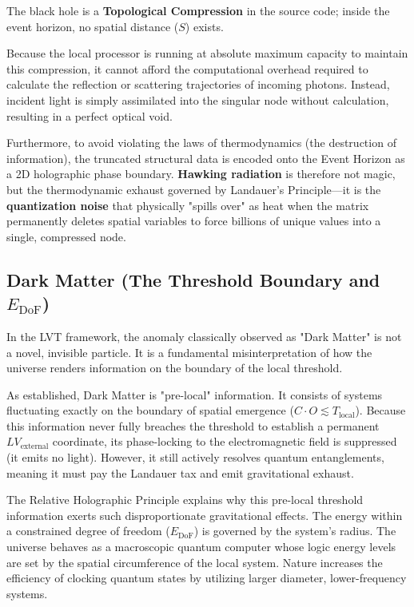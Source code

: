 \documentclass[12pt,a4paper]{article}
\begin{document}
The black hole is a \textbf{Topological Compression} in the source code; inside the event horizon, no spatial distance ($S$) exists. 

Because the local processor is running at absolute maximum capacity to maintain this compression, it cannot afford the computational overhead required to calculate the reflection or scattering trajectories of incoming photons. Instead, incident light is simply assimilated into the singular node without calculation, resulting in a perfect optical void.

Furthermore, to avoid violating the laws of thermodynamics (the destruction of information), the truncated structural data is encoded onto the Event Horizon as a 2D holographic phase boundary. \textbf{Hawking radiation} is therefore not magic, but the thermodynamic exhaust governed by Landauer's Principle---it is the \textbf{quantization noise} that physically "spills over" as heat when the matrix permanently deletes spatial variables to force billions of unique values into a single, compressed node.


\subsection{Dark Matter (The Threshold Boundary and $E_{\mathrm{DoF}}$)}

In the LVT framework, the anomaly classically observed as "Dark Matter" is not a novel, invisible particle. It is a fundamental misinterpretation of how the universe renders information on the boundary of the local threshold.

As established, Dark Matter is "pre-local" information. It consists of systems fluctuating exactly on the boundary of spatial emergence ($C \cdot O \lesssim T_{\mathrm{local}}$). Because this information never fully breaches the threshold to establish a permanent $LV_{\mathrm{external}}$ coordinate, its phase-locking to the electromagnetic field is suppressed (it emits no light). However, it still actively resolves quantum entanglements, meaning it must pay the Landauer tax and emit gravitational exhaust.

The Relative Holographic Principle explains why this pre-local threshold information exerts such disproportionate gravitational effects. The energy within a constrained degree of freedom ($E_{\mathrm{DoF}}$) is governed by the system's radius. The universe behaves as a macroscopic quantum computer whose logic energy levels are set by the spatial circumference of the local system. Nature increases the efficiency of clocking quantum states by utilizing larger diameter, lower-frequency systems.
\end{document}
